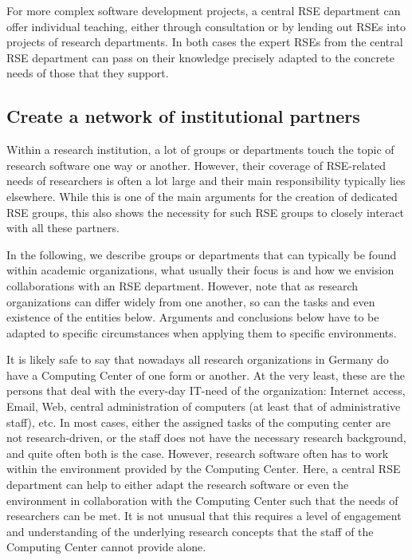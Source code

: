 \documentclass{article}
\begin{document}
For more complex software development projects, a central RSE department can offer individual teaching, either through consultation or by lending out RSEs into projects of research departments.
In both cases the expert RSEs from the central RSE department can pass on their knowledge precisely adapted to the concrete needs of those that they support.

\subsection{Create a network of institutional partners}

Within a research institution, a lot of groups or departments touch the topic of research software one way or another.
However, their coverage of RSE-related needs of researchers is often a lot large and their main responsibility typically lies elsewhere.
While this is one of the main arguments for the creation of dedicated RSE groups, this also shows the necessity for such RSE groups to closely interact with all these partners.

In the following, we describe groups or departments that can typically be found within academic organizations,
what usually their focus is and how we envision collaborations with an RSE department.
However, note that as research organizations can differ widely from one another, so can the tasks and even existence of the entities below.
Arguments and conclusions below have to be adapted to specific circumstances when applying them to specific environments.

It is likely safe to say that nowadays all research organizations in Germany do have a Computing Center of one form or another.
At the very least, these are the persons that deal with the every-day IT-need of the organization:
Internet access, Email, Web, central administration of computers (at least that of administrative staff), etc.
In most cases, either the assigned tasks of the computing center are not research-driven, or the staff does not have the necessary research background, and quite often both is the case.
However, research software often has to work within the environment provided by the Computing Center.
Here, a central RSE department can help to either adapt the research software or even the environment in collaboration with the Computing Center such that the needs of researchers can be met.
It is not unusual that this requires a level of engagement and understanding of the underlying research concepts that the staff of the Computing Center cannot provide alone.
\end{document}
